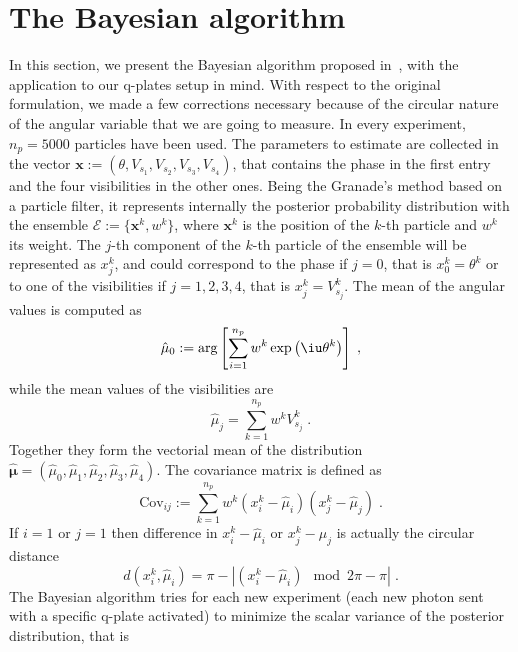 \documentclass[superscriptaddress,notitlepage,pra]{revtex4-1}
\begin{document}
\section{The Bayesian algorithm}
%
In this section, we present the Bayesian algorithm proposed in~\cite{granade2012robust}, with the application to our q-plates setup in mind. With respect to the original formulation, we made a few corrections necessary because of the circular nature of the angular variable that we are going to measure. In every experiment, $n_p = 5000$ particles have been used. The parameters to estimate are collected in the vector $\boldsymbol{x} := \left( \theta, V_{s_1}, V_{s_2}, V_{s_3}, V_{s_4} \right)$, that contains the phase in the first entry and the four visibilities in the other ones. Being the Granade's method based on a particle filter, it represents internally the posterior probability distribution with the ensemble $\mathcal{E} := \lbrace \boldsymbol{x}^k, w^k \rbrace$, where $\boldsymbol{x}^k$ is the position of the $k$-th particle and $w^k$ its weight. The $j$-th component of the $k$-th particle of the ensemble will be represented as $x_j^k$, and could correspond to the phase if $j=0$, that is $x^k_0 = \theta^k$ or to one of the visibilities if $j=1, 2, 3, 4$, that is $x^k_j = V^k_{s_j}$. The mean of the angular values is computed as
%
\begin{equation}
	\hat{\mu}_0 := \arg \left[ \sum_{i=1}^{n_{p}} w^k \exp \left( \iu \theta^k \right) \right] \; ,
\end{equation}
%
while the mean values of the visibilities are
%
\begin{equation}
	\hat{\mu}_j = \sum_{k=1}^{n_p} w^k V^k_{s_j} \; .
\end{equation}
%
Together they form the vectorial mean of the distribution $\boldsymbol{\hat{\mu}} = (\hat{\mu}_0, \hat{\mu}_1, \hat{\mu}_2, \hat{\mu}_3, \hat{\mu}_4)$. The covariance matrix is defined as
%
\begin{equation}
	\text{Cov}_{ij} := \sum_{k=1}^{n_{p}} w^k (x^k_i - \hat{\mu}_i)  (x^k_j - \hat{\mu}_j) \; .
\end{equation}
%
If $i=1$ or $j=1$ then difference in $x^k_i - \hat{\mu}_i$ or $x^k_j - \hat{\mu}_j$ is actually the circular distance
%
\begin{equation}
	d(x^k_i, \hat{\mu}_i) = \pi - | (x^k_i - \hat{\mu}_i) \mod 2 \pi - \pi| \; .
\end{equation}
%
The Bayesian algorithm tries for each new experiment (each new photon sent with a specific q-plate activated) to minimize the scalar variance of the posterior distribution, that is
\end{document}
